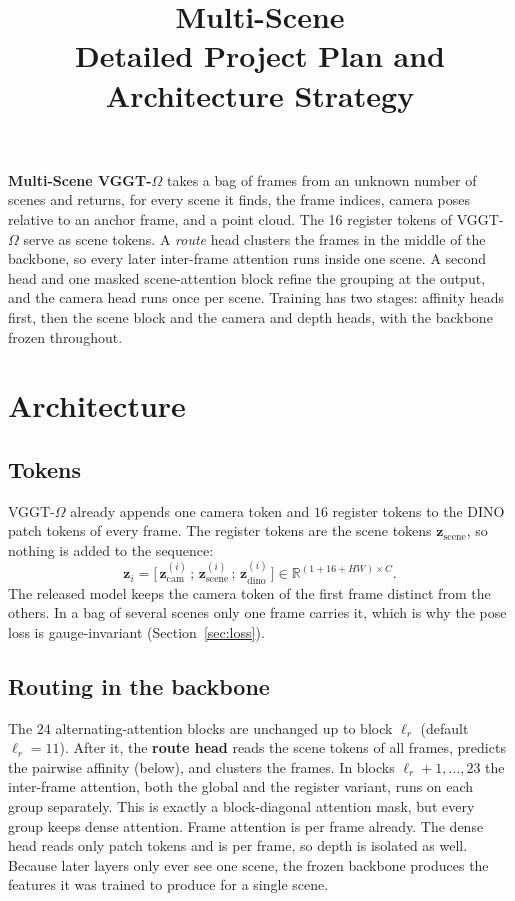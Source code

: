 \documentclass[11pt, a4paper]{article}
\title{%
  {\Huge\bfseries\color{accent} Multi-Scene \VGGT}\\[0.6em]
  {\Large\color{gray} Detailed Project Plan and Architecture Strategy}%
}
\author{}
\date{}
\newcommand{\zcam}{\bm{z}_{\mathrm{cam}}}
\newcommand{\zscene}{\bm{z}_{\mathrm{scene}}}
\newcommand{\zdino}{\bm{z}_{\mathrm{dino}}}
\newcommand{\VGGT}{VGGT-$\Omega$}
\begin{document}
\maketitle
\thispagestyle{fancy}
\vspace{-2.5em}

\begin{keybox}[Summary]
\textbf{Multi-Scene \VGGT} takes a bag of frames from an unknown number of scenes and returns,
for every scene it finds, the frame indices, camera poses relative to an anchor frame, and a
point cloud. The 16 register tokens of \VGGT{} serve as scene tokens. A \emph{route} head
clusters the frames in the middle of the backbone, so every later inter-frame attention runs
inside one scene. A second head and one masked scene-attention block refine the grouping at
the output, and the camera head runs once per scene. Training has two stages: affinity heads
first, then the scene block and the camera and depth heads, with the backbone frozen throughout.
\end{keybox}

\tableofcontents
\vspace{1em}

\section{Architecture}

\subsection{Tokens}
\VGGT{} already appends one camera token and $16$ register tokens to the DINO patch tokens of
every frame. The register tokens are the scene tokens $\zscene$, so nothing is added to the
sequence:
\begin{equation}
  \bm{z}_i = \big[\, \zcam^{(i)} \,;\, \zscene^{(i)} \,;\, \zdino^{(i)} \,\big]
  \in \mathbb{R}^{(1 + 16 + HW) \times C}.
\end{equation}
The released model keeps the camera token of the first frame distinct from the others. In a
bag of several scenes only one frame carries it, which is why the pose loss is gauge-invariant
(Section~\ref{sec:loss}).

\subsection{Routing in the backbone}
The $24$ alternating-attention blocks are unchanged up to block $\ell_r$ (default $\ell_r = 11$).
After it, the \textbf{route head} reads the scene tokens of all frames, predicts the pairwise
affinity (below), and clusters the frames. In blocks $\ell_r + 1,\dots,23$ the inter-frame
attention, both the global and the register variant, runs on each group separately. This is
exactly a block-diagonal attention mask, but every group keeps dense attention. Frame
attention is per frame already. The dense head reads only patch tokens and is per frame, so
depth is isolated as well. Because later layers only ever see one scene, the frozen backbone
produces the features it was trained to produce for a single scene.
\end{document}

